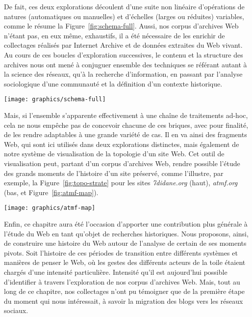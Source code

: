 \documentclass[symmetric,justified,marginals=raggedouter]{tufte-book}
\begin{document}
\noindent De fait, ces deux explorations découlent d'une suite non linéaire d'opé\-rations de natures (automatiques ou manuelles) et d'échelles (lar\-ges ou réduites) variables, comme le résume la Figure~\ref{fig:schema-full}. Aussi, nos corpus d'archives Web n'étant pas, en eux même, exhaustifs, il a été nécessaire de les enrichir de collectages réalisés par Internet Archive et de données extraites du Web vivant. Au cours de ces boucles d'exploration successives, le contenu et la structure des archives nous ont mené à conjuguer ensemble des techniques se référant autant à la science des réseaux, qu'à la recherche d'information, en passant par l'analyse sociologique d'une communauté et la définition d'un contexte historique.

\begin{figure*}[hbtp]%
  \texttt{[image: graphics/schema-full]}
  \caption{Résumé des diverses opérations mises en place lors des explorations \protect\ref{sec:6_blogs} et \protect\ref{sec:6_printemps}, avec distinction entre approches automatique et manuelle}
  \label{fig:schema-full}
\end{figure*}

\noindent Mais, si l'ensemble s'apparente effectivement à une chaîne de traitements ad-hoc, cela ne nous empêche pas de concevoir chacune de ces briques, avec pour finalité, de les rendre adaptables à une grande variété de cas. Il en va ainsi des fragments Web, qui sont ici utilisés dans deux explorations distinctes, mais également de notre système de visualisation de la topologie d'un site Web. Cet outil de visualisation peut, partant d'un corpus d'archives Web, rendre possible l'étude des grands moments de l'histoire d'un site préservé, comme l'illustre, par exemple, la Figure~\ref{fig:topo-strate} pour les sites \textit{7didane.org} (haut), \textit{atmf.org} (bas, et Figure~\ref{fig:atmf-map}).

\begin{marginfigure}%
  \texttt{[image: graphics/atmf-map]}
  \vspace*{0.2cm}  
  \caption{\textit{atmf.org} (rouge) dans l'e-Diaspora marocaine}
  \label{fig:atmf-map}
\end{marginfigure} 

Enfin, ce chapitre aura été l'occasion d'apporter une contribution plus générale à l'étude du Web en tant qu'objet de recherches historiques. Nous proposons, ainsi, de construire une histoire du Web autour de l'analyse de certain de ses moments pivots. Soit l'histoire de ces périodes de transition entre différents systèmes et manières de penser le Web, où les gestes des différents acteurs de la toile étaient chargés d'une intensité particulière. Intensité qu'il est aujourd'hui possible d'identifier à travers l'exploration de nos corpus d'archives Web. Mais, tout au long de ce chapitre, nos collectages n'ont pu témoigner que de la première étape du moment qui nous intéressait, à savoir la migration des blogs vers les réseaux sociaux.
\end{document}
